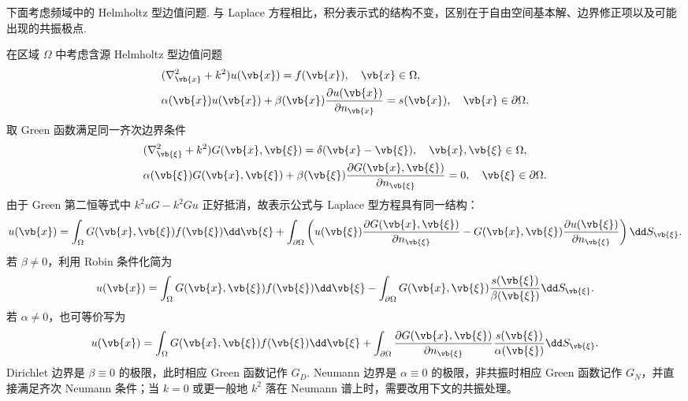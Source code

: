 下面考虑频域中的 Helmholtz 型边值问题. 与 Laplace 方程相比，积分表示式的结构不变，区别在于自由空间基本解、边界修正项以及可能出现的共振极点.


在区域 \(\Omega\) 中考虑含源 Helmholtz 型边值问题
\begin{align*}
	&(\nabla_{\vb{x}}^2+k^2)u(\vb{x})=f(\vb{x}),\quad \vb{x}\in\Omega,\\
	&\alpha(\vb{x})u(\vb{x})+\beta(\vb{x})\frac{\partial u(\vb{x})}{\partial n_{\vb{x}}}=s(\vb{x}),\quad \vb{x}\in\partial\Omega.
\end{align*}
取 Green 函数满足同一齐次边界条件
\begin{align*}
	&(\nabla_{\vb{\xi}}^2+k^2)G(\vb{x},\vb{\xi})=\delta(\vb{x}-\vb{\xi}),\quad \vb{x},\vb{\xi}\in\Omega,\\
	&\alpha(\vb{\xi})G(\vb{x},\vb{\xi})+\beta(\vb{\xi})\frac{\partial G(\vb{x},\vb{\xi})}{\partial n_{\vb{\xi}}}=0,
	\quad \vb{\xi}\in\partial\Omega.
\end{align*}
由于 Green 第二恒等式中 \(k^2uG-k^2Gu\) 正好抵消，故表示公式与 Laplace 型方程具有同一结构：
\begin{align*}
	u(\vb{x})
	=\int_\Omega G(\vb{x},\vb{\xi})f(\vb{\xi})\dd\vb{\xi}
	+\int_{\partial\Omega}\left(u(\vb{\xi})\frac{\partial G(\vb{x},\vb{\xi})}{\partial n_{\vb{\xi}}}-G(\vb{x},\vb{\xi})\frac{\partial u(\vb{\xi})}{\partial n_{\vb{\xi}}}\right)\dd S_{\vb{\xi}}.
\end{align*}
若 \(\beta\neq0\)，利用 Robin 条件化简为
\begin{align*}
	u(\vb{x})
	=\int_\Omega G(\vb{x},\vb{\xi})f(\vb{\xi})\dd\vb{\xi}
	-\int_{\partial\Omega}G(\vb{x},\vb{\xi})\frac{s(\vb{\xi})}{\beta(\vb{\xi})}\dd S_{\vb{\xi}}.
\end{align*}
若 \(\alpha\neq0\)，也可等价写为
\begin{align*}
	u(\vb{x})
	=\int_\Omega G(\vb{x},\vb{\xi})f(\vb{\xi})\dd\vb{\xi}
	+\int_{\partial\Omega}\frac{\partial G(\vb{x},\vb{\xi})}{\partial n_{\vb{\xi}}}\frac{s(\vb{\xi})}{\alpha(\vb{\xi})}\dd S_{\vb{\xi}}.
\end{align*}
Dirichlet 边界是 \(\beta\equiv0\) 的极限，此时相应 Green 函数记作 \(G_D\). Neumann 边界是 \(\alpha\equiv0\) 的极限，非共振时相应 Green 函数记作 \(G_N\)，并直接满足齐次 Neumann 条件；当 \(k=0\) 或更一般地 \(k^2\) 落在 Neumann 谱上时，需要改用下文的共振处理。

